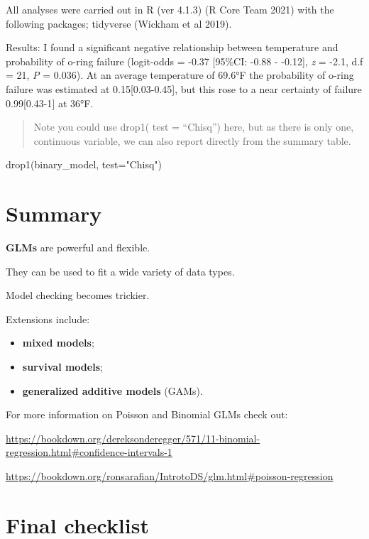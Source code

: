 \documentclass[
]{book}
\newenvironment{Shaded}{\begin{snugshade}}{\end{snugshade}}
\newcommand{\AttributeTok}[1]{\textcolor[rgb]{0.77,0.63,0.00}{#1}}
\newcommand{\FunctionTok}[1]{\textcolor[rgb]{0.00,0.00,0.00}{#1}}
\newcommand{\NormalTok}[1]{#1}
\newcommand{\StringTok}[1]{\textcolor[rgb]{0.31,0.60,0.02}{#1}}
\providecommand{\tightlist}{%
  \setlength{\itemsep}{0pt}\setlength{\parskip}{0pt}}
\begin{document}
All analyses were carried out in R (ver 4.1.3) (R Core Team 2021) with the following packages; tidyverse (Wickham et al 2019).

Results: I found a significant negative relationship between temperature and probability of o-ring failure (logit-odds = -0.37 {[}95\%CI: -0.88 - -0.12{]}, \emph{z} = -2.1, d.f = 21, \emph{P} = 0.036). At an average temperature of 69.6°F the probability of o-ring failure was estimated at 0.15{[}0.03-0.45{]}, but this rose to a near certainty of failure 0.99{[}0.43-1{]} at 36°F.

\begin{quote}
Note you could use drop1( test = ``Chisq'') here, but as there is only one, continuous variable, we can also report directly from the summary table.
\end{quote}

\begin{Shaded}
\begin{Highlighting}[]
\FunctionTok{drop1}\NormalTok{(binary\_model, }\AttributeTok{test=}\StringTok{"Chisq"}\NormalTok{)}
\end{Highlighting}
\end{Shaded}

\hypertarget{summary-9}{%
\section{Summary}\label{summary-9}}

\textbf{GLMs} are powerful and flexible.

They can be used to fit a wide variety of data types.

Model checking becomes trickier.

Extensions include:

\begin{itemize}
\tightlist
\item
  \textbf{mixed models};
\item
  \textbf{survival models};
\item
  \textbf{generalized additive models} (GAMs).
\end{itemize}

For more information on Poisson and Binomial GLMs check out:

\url{https://bookdown.org/dereksonderegger/571/11-binomial-regression.html\#confidence-intervals-1}

\url{https://bookdown.org/ronsarafian/IntrotoDS/glm.html\#poisson-regression}

\hypertarget{final-checklist}{%
\section{Final checklist}\label{final-checklist}}
\end{document}
